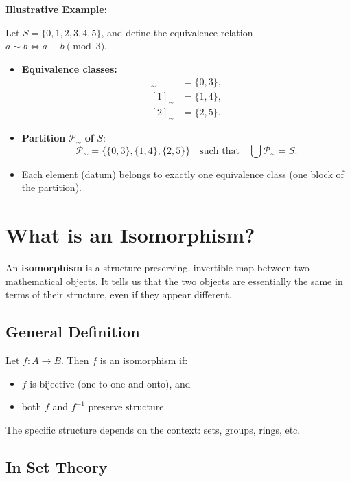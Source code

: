 \documentclass[10pt]{article}
\theoremstyle{plain}
\theoremstyle{definition}
\begin{document}
	\bigskip
	
	\textbf{Illustrative Example:}
	
	Let \( S = \{0, 1, 2, 3, 4, 5\} \), and define the equivalence relation \( a \sim b \iff a \equiv b \pmod{3} \).
	
	\begin{itemize}
		\item \textbf{Equivalence classes:}
		\begin{align*}
			[0]_\sim &= \{0, 3\}, \\
			[1]_\sim &= \{1, 4\}, \\
			[2]_\sim &= \{2, 5\}.
		\end{align*}
		
		\item \textbf{Partition } \( \mathcal{P}_\sim \) \textbf{ of } \( S \): 
		\[
		\mathcal{P}_\sim = \{ \{0, 3\}, \{1, 4\}, \{2, 5\} \}
		\quad \text{such that} \quad \bigcup \mathcal{P}_\sim = S.
		\]
		
		\item Each element (datum) belongs to exactly one equivalence class (one block of the partition).
	\end{itemize}
	
	\section*{What is an Isomorphism?}
	
	An \textbf{isomorphism} is a structure-preserving, invertible map between two mathematical objects. It tells us that the two objects are essentially the same in terms of their structure, even if they appear different.
	
	\subsection*{General Definition}
	
	Let \( f : A \to B \). Then \( f \) is an isomorphism if:
	
	\begin{itemize}
		\item \( f \) is bijective (one-to-one and onto), and
		\item both \( f \) and \( f^{-1} \) preserve structure.
	\end{itemize}
	
	The specific structure depends on the context: sets, groups, rings, etc.
	
	\subsection*{In Set Theory}
	
\end{document}
